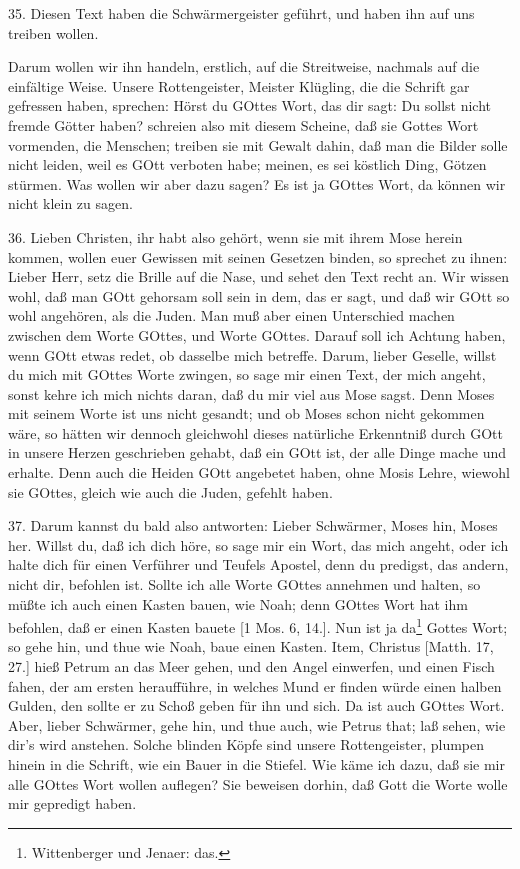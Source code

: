 35. Diesen Text haben die Schwärmergeister geführt, und haben ihn auf uns treiben wollen.

Darum wollen wir ihn handeln, erstlich, auf die Streitweise, nachmals auf die einfältige Weise. Unsere Rottengeister, Meister Klügling, die die Schrift gar gefressen haben, sprechen: Hörst du GOttes Wort, das dir sagt: Du sollst nicht fremde Götter haben? schreien also mit diesem Scheine, daß sie Gottes Wort vormenden, die Menschen; treiben sie mit Gewalt dahin, daß man die Bilder solle nicht leiden, weil es GOtt verboten habe; meinen, es sei köstlich Ding, Götzen stürmen. Was wollen wir aber dazu sagen? Es ist ja GOttes Wort, da können wir nicht klein zu sagen.

36. Lieben Christen, ihr habt also gehört, wenn sie mit ihrem Mose herein kommen, wollen euer Gewissen mit seinen Gesetzen binden, so sprechet zu ihnen: Lieber Herr, setz die Brille auf die Nase, und sehet den Text recht an. Wir wissen wohl, daß man GOtt gehorsam soll sein in dem, das er sagt, und daß wir GOtt so wohl angehören, als die Juden. Man muß aber einen Unterschied machen zwischen dem Worte GOttes, und Worte GOttes. Darauf soll ich Achtung haben, wenn GOtt etwas redet, ob dasselbe mich betreffe. Darum, lieber Geselle, willst du mich mit GOttes Worte zwingen, so sage mir einen Text, der mich angeht, sonst kehre ich mich nichts daran, daß du mir viel aus Mose sagst. Denn Moses mit seinem Worte ist uns nicht gesandt; und ob Moses schon nicht gekommen wäre, so hätten wir dennoch gleichwohl dieses natürliche Erkenntniß durch GOtt in unsere Herzen geschrieben gehabt, daß ein GOtt ist, der alle Dinge mache und erhalte. Denn auch die Heiden GOtt angebetet haben, ohne Mosis Lehre, wiewohl sie GOttes, gleich wie auch die Juden, gefehlt haben.

37. Darum kannst du bald also antworten: Lieber Schwärmer, Moses hin, Moses her. Willst du, daß ich dich höre, so sage mir ein Wort, das mich angeht, oder ich halte dich für einen Verführer und Teufels Apostel, denn du predigst, das andern, nicht dir, befohlen ist. Sollte ich alle Worte GOttes annehmen und halten, so müßte ich auch einen Kasten bauen, wie Noah; denn GOttes Wort hat ihm befohlen, daß er einen Kasten bauete [1 Mos. 6, 14.]. Nun ist ja da\footnote{Wittenberger und Jenaer: das.} Gottes Wort; so gehe hin, und thue wie Noah, baue einen Kasten. Item, Christus [Matth. 17, 27.] hieß Petrum an das Meer gehen, und den Angel einwerfen, und einen Fisch fahen, der am ersten heraufführe, in welches Mund er finden würde einen halben Gulden, den sollte er zu Schoß geben für ihn und sich. Da ist auch GOttes Wort. Aber, lieber Schwärmer, gehe hin, und thue auch, wie Petrus that; laß sehen, wie dir’s wird anstehen. Solche blinden Köpfe sind unsere Rottengeister, plumpen hinein in die Schrift, wie ein Bauer in die Stiefel. Wie käme ich dazu, daß sie mir alle GOttes Wort wollen auflegen? Sie beweisen dorhin, daß Gott die Worte wolle mir gepredigt haben.

